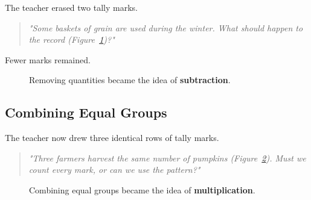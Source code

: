 \documentclass[11pt]{article}
\begin{document}
The teacher erased two tally marks.
\begin{quote}
\emph{"Some baskets of grain are used during the winter. What should happen to the record (Figure~\ref{fig:subtractiontally})?"}
\end{quote}
Fewer marks remained.

\begin{figure}[ht]
\centering


\caption{ Removing quantities became the idea of \textbf{subtraction}.}

\label{fig:subtractiontally}

\end{figure}

\subsection*{Combining Equal Groups}
The teacher now drew three identical rows of tally marks.
\begin{quote}
\emph{"Three farmers harvest the same number of pumpkins (Figure~\ref{fig:multiplicationtally}). Must we count every mark, or can we use the pattern?"}
\end{quote}



\begin{figure}[ht]
\centering


\caption{ Combining equal groups became the idea of \textbf{multiplication}.}

\label{fig:multiplicationtally}

\end{figure}
\end{document}
